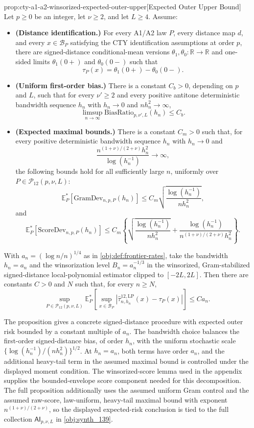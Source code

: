 \begin{propositionv}{prop:cty-a1-a2-winsorized-expected-outer-upper}[Expected Outer Upper Bound]
Let \(p\geq 0\) be an integer, let \(\nu\geq 2\), and let \(L\geq 4\).  Assume:
\begin{itemize}
\item \textbf{(Distance identification.)}  For every A1/A2 law \(P\), every distance map \(d\), and every \(x\in\mathcal B_P\) satisfying the CTY identification assumptions at order \(p\), there are signed-distance conditional-mean versions \(\theta_1,\theta_0:\mathbb R\to\mathbb R\) and one-sided limits \(\theta_1(0+)\) and \(\theta_0(0-)\) such that
\[
\tau_P(x)=\theta_1(0+)-\theta_0(0-).
\]
\item \textbf{(Uniform first-order bias.)}  There is a constant \(C_b>0\), depending on \(p\) and \(L\), such that for every \(\nu'\geq 2\) and every positive antitone deterministic bandwidth sequence \(h_n\) with \(h_n\to0\) and \(n h_n^2\to\infty\),
\[
\limsup_{n\to\infty}
\mathrm{BiasRatio}_{p,\nu',L}(h_n)\leq C_b .
\]
\item \textbf{(Expected maximal bounds.)}  There is a constant \(C_m>0\) such that, for every positive deterministic bandwidth sequence \(h_n\) with \(h_n\to0\) and
\[
\frac{n^{(1+\nu)/(2+\nu)}h_n^2}{\log(h_n^{-1})}\to\infty,
\]
the following bounds hold for all sufficiently large \(n\), uniformly over \(P\in\mathcal P_{12}(p,\nu,L)\):
\[
\mathbb E_P^*\!\left[\mathrm{GramDev}_{n,p,P}(h_n)\right]
\leq
C_m
\sqrt{\frac{\log(h_n^{-1})}{n h_n^2}},
\]
and
\[
\mathbb E_P^*\!\left[\mathrm{ScoreDev}_{n,p,P}(h_n)\right]
\leq
C_m\left\{
\sqrt{\frac{\log(h_n^{-1})}{n h_n^2}}
+
\frac{\log(h_n^{-1})}{n^{(1+\nu)/(2+\nu)}h_n^2}
\right\}.
\]
\end{itemize}
With \(a_n=(\log n/n)^{1/4}\) as in \cref{obj:def:frontier-rates}, take the bandwidth \(h_n=a_n\) and the winsorization level \(B_n=a_n^{-1/3}\) in the winsorized, Gram-stabilized signed-distance local-polynomial estimator clipped to \([-2L,2L]\).  Then there are constants \(C>0\) and \(N\) such that, for every \(n\geq N\),
\[
\sup_{P\in\mathcal P_{12}(p,\nu,L)}
\mathbb E_P^*\!\left[
\sup_{x\in\mathcal B_P}
\left|\widehat\tau^{12,\mathrm{LP}}_{n,h_n}(x)-\tau_P(x)\right|
\right]
\leq C a_n .
\]
\end{propositionv}

The proposition gives a concrete signed-distance procedure with expected outer risk bounded by a constant multiple of \(a_n\). The bandwidth choice balances the first-order signed-distance bias, of order \(h_n\), with the uniform stochastic scale \(\{\log(h_n^{-1})/(n h_n^2)\}^{1/2}\). At \(h_n=a_n\), both terms have order \(a_n\), and the additional heavy-tail term in the assumed maximal bound is controlled under the displayed moment condition. The winsorized-score lemma used in the appendix supplies the bounded-envelope score component needed for this decomposition. The full proposition additionally uses the assumed uniform Gram control and the assumed raw-score, law-uniform, heavy-tail maximal bound with exponent \(n^{(1+\nu)/(2+\nu)}\), so the displayed expected-risk conclusion is tied to the full collection \(\mathsf{AI}_{p,\nu,L}\) in \cref{obj:synth_139}.

